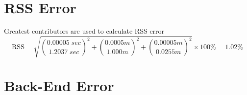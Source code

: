 \documentclass{report}
\begin{document}
\section*{RSS Error}

\begin{center}
  \noindent Greatest contributors are used to calculate RSS error
  \begin{equation*}
      \text{RSS} = \sqrt{ \left( \frac{0.00005 \; sec}{1.2037 \; sec} \right)^2 
      + \left( \frac{0.0005 m}{1.000 m} \right)^2
      + \left( \frac{0.00005 m}{0.0255 m} \right)^2} \times 100\% = 1.02\%
  \end{equation*}
\end{center}

\section*{Back-End Error}
\end{document}
